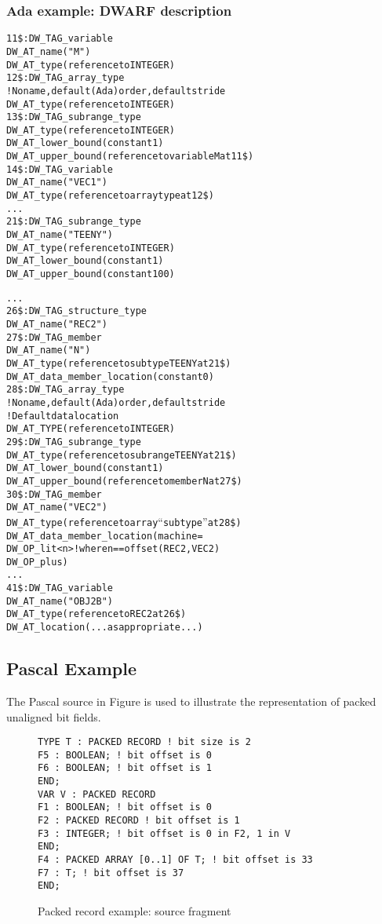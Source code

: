 \subsubsection{Ada example: DWARF description}
\label{app:adaexampledwarfdescription}

\begin{alltt}
11\$: DW\_TAG\_variable
        DW\_AT\_name("M")
        DW\_AT\_type(reference to INTEGER)
12\$: DW\_TAG\_array\_type
        ! No name, default (Ada) order, default stride
        DW\_AT\_type(reference to INTEGER)
13\$:    DW\_TAG\_subrange\_type
            DW\_AT\_type(reference to INTEGER)
            DW\_AT\_lower\_bound(constant 1)
            DW\_AT\_upper\_bound(reference to variable M at 11\$)
14\$: DW\_TAG\_variable
        DW\_AT\_name("VEC1")
        DW\_AT\_type(reference to array type at 12\$)
    . . .
21\$: DW\_TAG\_subrange\_type
        DW\_AT\_name("TEENY")
        DW\_AT\_type(reference to INTEGER)
        DW\_AT\_lower\_bound(constant 1)
        DW\_AT\_upper\_bound(constant 100)

      . . .
26\$: DW\_TAG\_structure\_type
        DW\_AT\_name("REC2")
27\$:   DW\_TAG\_member
            DW\_AT\_name("N")
            DW\_AT\_type(reference to subtype TEENY at 21\$)
            DW\_AT\_data\_member\_location(constant 0)
28\$:   DW\_TAG\_array\_type
            ! No name, default (Ada) order, default stride
            ! Default data location
            DW\_AT\_TYPE(reference to INTEGER)
29\$:       DW\_TAG\_subrange\_type
                DW\_AT\_type(reference to subrange TEENY at 21\$)
                DW\_AT\_lower\_bound(constant 1)
                DW\_AT\_upper\_bound(reference to member N at 27\$)
30\$:   DW\_TAG\_member
            DW\_AT\_name("VEC2")
            DW\_AT\_type(reference to array “subtype” at 28\$)
            DW\_AT\_data\_member\_location(machine=
                DW\_OP\_lit<n> ! where n == offset(REC2, VEC2)
                DW\_OP\_plus)
      . . .
41\$: DW\_TAG\_variable
        DW\_AT\_name("OBJ2B")
        DW\_AT\_type(reference to REC2 at 26\$)
        DW\_AT\_location(...as appropriate...)

\end{alltt}

\subsection{Pascal Example}
\label{app:pascalexample}

The Pascal source in 
Figure 
is used to illustrate the representation of packed unaligned bit
fields.
\begin{figure}[here]
\begin{lstlisting}
TYPE T : PACKED RECORD ! bit size is 2
F5 : BOOLEAN; ! bit offset is 0
F6 : BOOLEAN; ! bit offset is 1
END;
VAR V : PACKED RECORD
F1 : BOOLEAN; ! bit offset is 0
F2 : PACKED RECORD ! bit offset is 1
F3 : INTEGER; ! bit offset is 0 in F2, 1 in V
END;
F4 : PACKED ARRAY [0..1] OF T; ! bit offset is 33
F7 : T; ! bit offset is 37
END;
\end{lstlisting}
\caption{Packed record example: source fragment} \label{fig:packedrecordexamplesourcefragment}
\end{figure}

